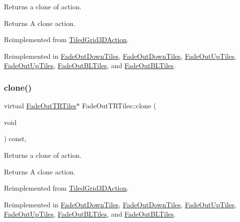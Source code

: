 Returns a clone of action.

\begin{DoxyReturn}{Returns}
A clone action. 
\end{DoxyReturn}


Reimplemented from \hyperlink{classTiledGrid3DAction_a689fd377cc0abae91db7def106529b53}{Tiled\+Grid3\+D\+Action}.



Reimplemented in \hyperlink{classFadeOutDownTiles_aa7b17d06be4e0d54a401464fd3edcee1}{Fade\+Out\+Down\+Tiles}, \hyperlink{classFadeOutDownTiles_a4a35c11502bbb834d6d4137cb03d2843}{Fade\+Out\+Down\+Tiles}, \hyperlink{classFadeOutUpTiles_af0311f93b8155bb8cd59db4320d630a0}{Fade\+Out\+Up\+Tiles}, \hyperlink{classFadeOutUpTiles_aa408cee44da1d5e8ebb41063d58a0de9}{Fade\+Out\+Up\+Tiles}, \hyperlink{classFadeOutBLTiles_ac52607f48d2a78ac604e4064bf72acec}{Fade\+Out\+B\+L\+Tiles}, and \hyperlink{classFadeOutBLTiles_a09ddf5d56bdc979d963430286d50792b}{Fade\+Out\+B\+L\+Tiles}.

\mbox{\label{classFadeOutTRTiles_aa1b433c762335359829791f3b1d2b849}} 
\subsubsection{\texorpdfstring{clone()}{clone()}\hspace{0.1cm}{\footnotesize\ttfamily [2/2]}}
{\footnotesize\ttfamily virtual \hyperlink{classFadeOutTRTiles}{Fade\+Out\+T\+R\+Tiles}$\ast$ Fade\+Out\+T\+R\+Tiles\+::clone (\begin{DoxyParamCaption}\item[{void}]{ }\end{DoxyParamCaption}) const\hspace{0.3cm}{\ttfamily [override]}, {\ttfamily [virtual]}}

Returns a clone of action.

\begin{DoxyReturn}{Returns}
A clone action. 
\end{DoxyReturn}


Reimplemented from \hyperlink{classTiledGrid3DAction_a689fd377cc0abae91db7def106529b53}{Tiled\+Grid3\+D\+Action}.



Reimplemented in \hyperlink{classFadeOutDownTiles_aa7b17d06be4e0d54a401464fd3edcee1}{Fade\+Out\+Down\+Tiles}, \hyperlink{classFadeOutDownTiles_a4a35c11502bbb834d6d4137cb03d2843}{Fade\+Out\+Down\+Tiles}, \hyperlink{classFadeOutUpTiles_af0311f93b8155bb8cd59db4320d630a0}{Fade\+Out\+Up\+Tiles}, \hyperlink{classFadeOutUpTiles_aa408cee44da1d5e8ebb41063d58a0de9}{Fade\+Out\+Up\+Tiles}, \hyperlink{classFadeOutBLTiles_ac52607f48d2a78ac604e4064bf72acec}{Fade\+Out\+B\+L\+Tiles}, and \hyperlink{classFadeOutBLTiles_a09ddf5d56bdc979d963430286d50792b}{Fade\+Out\+B\+L\+Tiles}.

